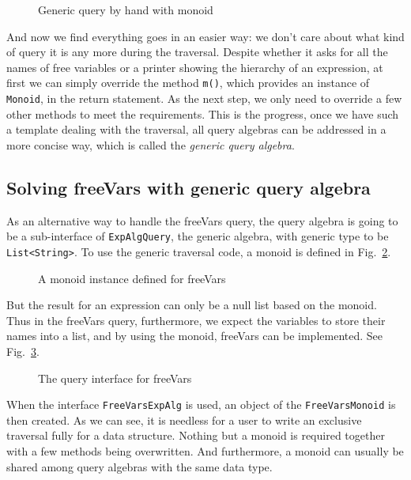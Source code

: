 \begin{figure}[tb]
\vspace{-.1in}
\caption{Generic query by hand with monoid}
\label{generic_query}
\end{figure}

And now we find everything goes in an easier way: we don't care about what kind of query it is any more during the traversal. Despite whether it asks for all the names of free variables or a printer showing the hierarchy of an expression, at first we can simply override the method \lstinline{m()}, which provides an instance of \lstinline{Monoid}, in the return statement. As the next step, we only need to override a few other methods to meet the requirements. This is the progress, once we have such a template dealing with the traversal, all query algebras can be addressed in a more concise way, which is called the \textit{generic query algebra}.

\subsection{Solving freeVars with generic query algebra}\label{subsec:solvingfreevars}

As an alternative way to handle the freeVars query, the query algebra is going to be a sub-interface of \lstinline{ExpAlgQuery}, the generic algebra, with generic type to be \lstinline{List<String>}. To use the generic traversal code, a monoid is defined in Fig.~\ref{freevars_monoid}.

\begin{figure}[tb]
\vspace{-.1in}
\caption{A monoid instance defined for freeVars}
\label{freevars_monoid}
\end{figure}

But the result for an expression can only be a null list based on the monoid. Thus in the freeVars query, furthermore, we expect the variables to store their names into a list, and by using the monoid, freeVars can be implemented. See Fig.~\ref{freevars_with_monoid}.

\begin{figure}[tb]
\vspace{-.1in}
\caption{The query interface for freeVars}
\label{freevars_with_monoid}
\end{figure}

When the interface \lstinline{FreeVarsExpAlg} is used, an object of the \lstinline{FreeVarsMonoid} is then created. As we can see, it is needless for a user to write an exclusive traversal fully for a data structure. Nothing but a monoid is required together with a few methods being overwritten. And furthermore, a monoid can usually be shared among query algebras with the same data type.
